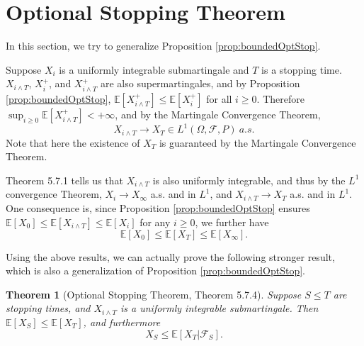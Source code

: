 \documentclass[openany]{book}
\newtheorem{theorem}{Theorem}[chapter]
\theoremstyle{definition}
\theoremstyle{remark}
\begin{document}
\section{Optional Stopping Theorem}
In this section, we try to generalize Proposition \ref{prop:boundedOptStop}.

Suppose $X_i$ is a uniformly integrable submartingale and $T$ is a stopping time. $X_{i\wedge T}$, $X_i^+$, and $X_{i\wedge T}^+$ are also supermartingales, and by Proposition \ref{prop:boundedOptStop}, $\mathbb{E}[X_{i\wedge T}^+]\le \mathbb{E}[X_i^+]$ for all $i\ge0$. Therefore $\sup_{i\ge0}\mathbb{E}[X_{i\wedge T}^+]<+\infty$, and by the Martingale Convergence Theorem,
\begin{equation*}
    X_{i\wedge T}\to X_T\in L^1(\Omega,\mathcal{F},P)\ a.s.
\end{equation*}
Note that here the existence of $X_T$ is guaranteed by the Martingale Convergence Theorem.

\cite{D10} Theorem 5.7.1 tells us that $X_{i\wedge T}$ is also uniformly integrable, and thus by the $L^1$ convergence Theorem, $X_i\to X_{\infty}$ a.s. and in $L^1$, and $X_{i\wedge T}\to X_T$ a.s. and in $L^1$. One consequence is, since Proposition \ref{prop:boundedOptStop} ensures $\mathbb{E}[X_0]\le \mathbb{E}[X_{i\wedge T}]\le \mathbb{E}[X_i]$ for any $i\ge0$, we further have
\begin{equation*}
    \mathbb{E}[X_0]\le \mathbb{E}[X_T]\le \mathbb{E}[X_{\infty}].
\end{equation*}

Using the above results, we can actually prove the following stronger result, which is also a generalization of Proposition \ref{prop:boundedOptStop}.
\begin{theorem}[Optional Stopping Theorem, \cite{D10} Theorem 5.7.4]
    Suppose $S\le T$ are stopping times, and $X_{i\wedge T}$ is a uniformly integrable submartingale. Then $\mathbb{E}[X_S]\le \mathbb{E}[X_T]$, and furthermore
    \begin{equation*}
        X_S\le \mathbb{E}[X_T|\mathcal{F}_S].
    \end{equation*}
\end{theorem}
\end{document}

